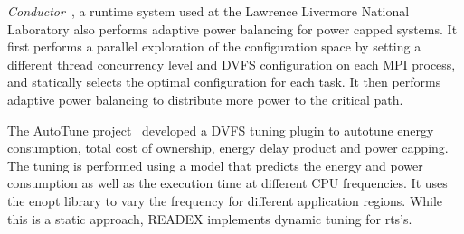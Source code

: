 \textit{Conductor}~\cite{Marathe}, a runtime system used at the Lawrence Livermore National Laboratory also performs adaptive power balancing for power capped systems. It first performs a parallel exploration of the configuration space by setting a different thread concurrency level and DVFS configuration on each MPI process, and statically selects the optimal configuration for each task. It then performs adaptive power balancing to distribute more power to the critical path.

The AutoTune project~\cite{guillen2016dvfs,AutoTune:Book2015} developed a DVFS tuning plugin to autotune energy consumption, total cost of ownership, energy delay product and power capping. The tuning is performed using a model that predicts the energy and power consumption as well as the execution time at different CPU frequencies. It uses the enopt library to vary the frequency for different application regions. While this is a static approach, READEX implements dynamic tuning for rts's.

